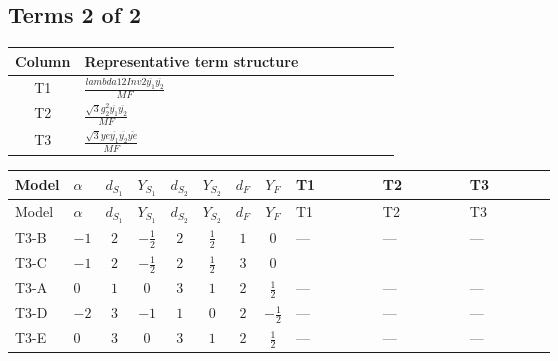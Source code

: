 \documentclass[8pt]{article}
\begin{document}
\begin{landscape}
\subsection*{Terms 2 of 2}
\begin{center}
\begin{tabular}{@{}c >{\raggedright\arraybackslash}p{0.82\linewidth}@{}}
\toprule
Column & Representative term structure \\
\midrule
T1 & \(\displaystyle \frac{lambda12Inv2 \overline{y_{1}} \overline{y_{2}}}{MF}\) \\
\midrule
T2 & \(\displaystyle \frac{\sqrt{3} g_{2}^{2} \overline{y_{1}} \overline{y_{2}}}{MF}\) \\
\midrule
T3 & \(\displaystyle \frac{\sqrt{3} ye \overline{y_{1}} \overline{y_{2}} \overline{ye}}{MF}\) \\
\midrule
\bottomrule
\end{tabular}
\end{center}
\smallskip
\tiny
\begin{longtable}{@{}llcccccc >{\raggedright\arraybackslash}p{0.21\linewidth} >{\raggedright\arraybackslash}p{0.21\linewidth} >{\raggedright\arraybackslash}p{0.21\linewidth}@{}}
\toprule
Model & $\alpha$ & $d_{S_1}$ & $Y_{S_1}$ & $d_{S_2}$ & $Y_{S_2}$ & $d_F$ & $Y_F$ & T1 & T2 & T3 \\
\midrule
\endfirsthead
\toprule
Model & $\alpha$ & $d_{S_1}$ & $Y_{S_1}$ & $d_{S_2}$ & $Y_{S_2}$ & $d_F$ & $Y_F$ & T1 & T2 & T3 \\
\midrule
\endhead
T3-B & $-1$ & $2$ & $-\frac{1}{2}$ & $2$ & $\frac{1}{2}$ & $1$ & $0$ & --- & --- & --- \\
\midrule
T3-C & $-1$ & $2$ & $-\frac{1}{2}$ & $2$ & $\frac{1}{2}$ & $3$ & $0$ & \scriptsize\adjustbox{max width=\linewidth}{$\begin{gathered} - \frac{2 lambda12Inv2 \overline{y_{1}} \overline{y_{2}}}{3 MF}\end{gathered}$} & \scriptsize\adjustbox{max width=\linewidth}{$\begin{gathered} - \frac{\sqrt{3} g_{2}^{2} \overline{y_{1}} \overline{y_{2}}}{2 MF}\end{gathered}$} & \scriptsize\adjustbox{max width=\linewidth}{$\begin{gathered} \frac{\sqrt{3} ye \overline{y_{1}} \overline{y_{2}} \overline{ye}}{6 MF}\end{gathered}$} \\
\midrule
T3-A & $0$ & $1$ & $0$ & $3$ & $1$ & $2$ & $\frac{1}{2}$ & --- & --- & --- \\
\midrule
T3-D & $-2$ & $3$ & $-1$ & $1$ & $0$ & $2$ & $-\frac{1}{2}$ & --- & --- & --- \\
\midrule
T3-E & $0$ & $3$ & $0$ & $3$ & $1$ & $2$ & $\frac{1}{2}$ & --- & --- & --- \\
\midrule
\bottomrule
\end{longtable}
\clearpage

\end{landscape}
\end{document}
